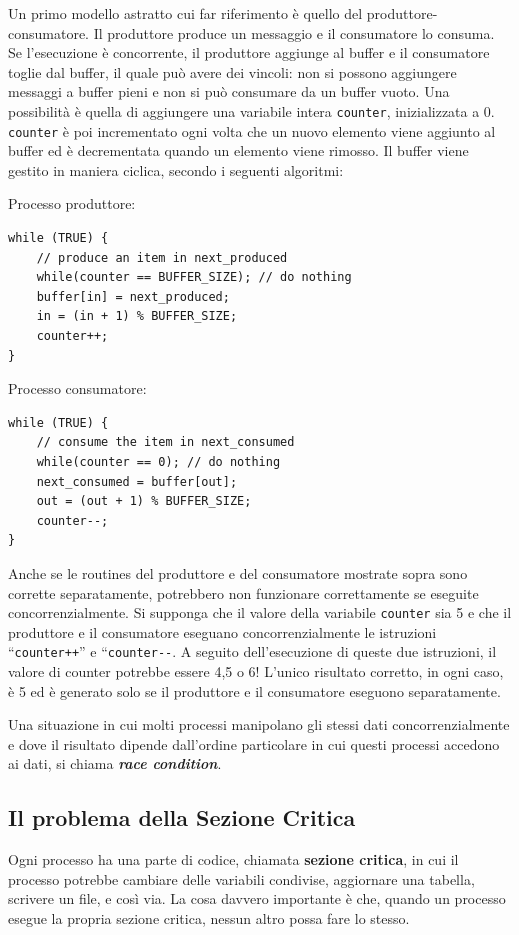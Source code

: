 \documentclass[a4paper]{article}
\begin{document}
Un primo modello astratto cui far riferimento è quello del produttore-consumatore. Il produttore produce un messaggio e il consumatore lo consuma. Se l'esecuzione è concorrente, il produttore aggiunge al buffer e il consumatore toglie dal buffer, il quale può avere dei vincoli: non si possono aggiungere messaggi a buffer pieni e non si può consumare da un buffer vuoto.\newline
Una possibilità è quella di aggiungere una variabile intera \texttt{counter}, inizializzata a 0. \texttt{counter} è poi incrementato ogni volta che un nuovo elemento viene aggiunto al buffer ed è decrementata quando un elemento viene rimosso. \newline
Il buffer viene gestito in maniera ciclica, secondo i seguenti algoritmi:

Processo produttore:
\begin{verbatim}
while (TRUE) {
    // produce an item in next_produced
    while(counter == BUFFER_SIZE); // do nothing
    buffer[in] = next_produced;
    in = (in + 1) % BUFFER_SIZE;
    counter++;
}
\end{verbatim}

Processo consumatore:
\begin{verbatim}
while (TRUE) {
    // consume the item in next_consumed
    while(counter == 0); // do nothing
    next_consumed = buffer[out];
    out = (out + 1) % BUFFER_SIZE;
    counter--;
}
\end{verbatim}

Anche se le routines del produttore e del consumatore mostrate sopra sono corrette separatamente, potrebbero non funzionare correttamente se eseguite concorrenzialmente. Si supponga che il valore della variabile \texttt{counter} sia 5 e che il produttore e il consumatore eseguano concorrenzialmente le istruzioni ``\texttt{counter++}'' e ``\texttt{counter-{}-}. A seguito dell'esecuzione di queste due istruzioni, il valore di counter potrebbe essere 4,5 o 6! L'unico risultato corretto, in ogni caso, è 5 ed è generato solo se il produttore e il consumatore eseguono separatamente.

Una situazione in cui molti processi manipolano gli stessi dati concorrenzialmente e dove il risultato dipende dall'ordine particolare in cui questi processi accedono ai dati, si chiama \textit{\textbf{race condition}}.

\subsection{Il problema della Sezione Critica}
Ogni processo ha una parte di codice, chiamata \textbf{sezione critica}, in cui il processo potrebbe cambiare delle variabili condivise, aggiornare una tabella, scrivere un file, e così via. La cosa davvero importante è che, quando un processo esegue la propria sezione critica, nessun altro possa fare lo stesso.
\end{document}
